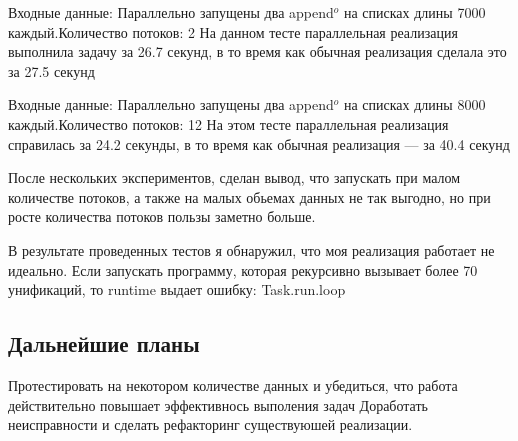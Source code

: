Входные данные: Параллельно запущены два append$^o$ на списках длины 7000 каждый.Количество потоков: 2 
На данном тесте параллельная реализация выполнила задачу за 26.7 секунд, в то время как обычная реализация сделала это за 27.5 секунд

Входные данные: Параллельно запущены два append$^o$ на списках длины 8000 каждый.Количество потоков: 12
На этом тесте параллельная реализация справилась за 24.2 секунды, в то время как обычная реализация --- за 40.4 секунд

После нескольких экспериментов, сделан вывод, что запускать при малом количестве потоков, а также на малых обьемах данных не так выгодно, но при росте количества потоков пользы заметно больше.

В результате проведенных тестов я обнаружил, что моя реализация работает не идеально. Если запускать программу, которая рекурсивно вызывает более 70 унификаций, то runtime выдает ошибку: Task.run.loop

\subsection{Дальнейшие планы}

Протестировать на некотором количестве данных и убедиться, что
работа действительно повышает эффективнось выполения задач 
Доработать неисправности и сделать рефакторинг
существуюшей реализации.


